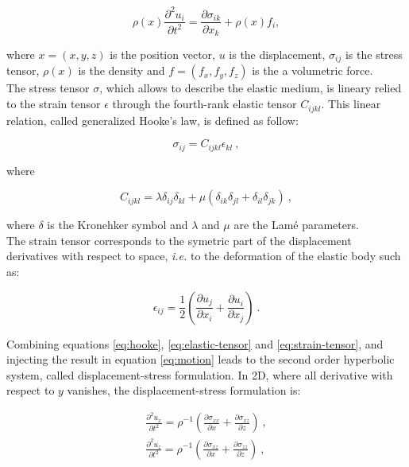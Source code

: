 \documentclass{gnulike}
\begin{document}
\begin{equation}
  \label{eq:motion}
  \rho(x) \frac{\partial^{2}u_{i}}{\partial t^{2}} = \frac{\partial \sigma_{ik}}{\partial x_{k}} + \rho(x)f_{i} ,
\end{equation}

\noindent where $x=(x,y,z)$ is the position vector, $u$ is the displacement, $\sigma_{ij}$ is the stress tensor, $\rho(x)$ is the density and $f=(f_{x}, f_{y}, f_{z})$ is the a volumetric force.\\

\noindent The stress tensor $\sigma$, which allows to describe the elastic medium, is lineary relied to the strain tensor $\epsilon$ through the fourth-rank elastic tensor $C_{ijkl}$. This linear relation, called generalized Hooke's law,  is defined as follow:

\begin{equation}
  \label{eq:hooke}
  \sigma_{ij} = C_{ijkl}\epsilon_{kl}\ ,
\end{equation} 

\noindent where

\begin{equation}
  \label{eq:elastic-tensor}
  C_{ijkl} = \lambda \delta_{ij} \delta_{kl} + \mu (\delta_{ik}\delta_{jl}+\delta_{il}\delta_{jk})\ ,
\end{equation}

\noindent where $\delta$ is the Kronehker symbol and $\lambda$ and $\mu$ are the Lam\'e parameters.\\

\noindent The strain tensor corresponds to the symetric part of the displacement derivatives with respect to space, \textit{i.e.} to the deformation of the elastic body such as:

\begin{equation}
  \label{eq:strain-tensor}
  \epsilon_{ij} = \frac{1}{2} \left( \frac{\partial u_{j}}{\partial x_{i}} + \frac{\partial u_{i}}{\partial x_{j}} \right)\ .
\end{equation}

\noindent Combining equations \ref{eq:hooke}, \ref{eq:elastic-tensor} and \ref{eq:strain-tensor}, and injecting the result in equation \ref{eq:motion} leads to the second order hyperbolic system, called displacement-stress formulation. In 2D, where all derivative with respect to $y$ vanishes, the displacement-stress formulation is:

\begin{eqnarray}
  \label{eq:displacement-stress}
  \frac{\partial ^{2} u_{x}}{\partial t^{2}} = \rho^{{\scriptscriptstyle-1}} \left( \frac{\partial \sigma_{xx}}{\partial x} + \frac{\partial \sigma_{xz}}{\partial z} \right)\ , \nonumber \\
  \frac{\partial ^{2} u_{z}}{\partial t^{2}} = \rho^{{\scriptscriptstyle -1}} \left( \frac{\partial \sigma_{xz}}{\partial x} + \frac{\partial \sigma_{zz}}{\partial z} \right)\ ,
\end{eqnarray}
\end{document}
